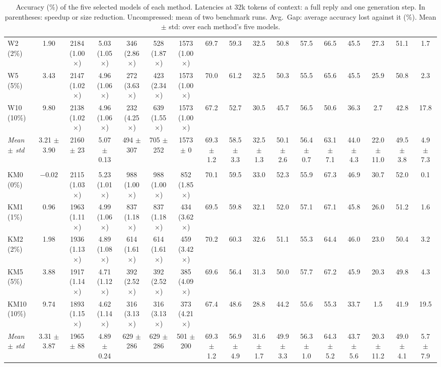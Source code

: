 \documentclass[11pt]{article}
\begin{document}
\begin{landscape}
\begin{table}[!ht]
{\begin{tabular}{lcccccccccccccccc}
W2 (2\%) & 1.90 & 2184 (1.00$\times$) & 5.03 (1.05$\times$) & 346 (2.86$\times$) & 528 (1.87$\times$) & 1573 (1.00$\times$) & 69.7 & 59.3 & 32.5 & 50.8 & 57.5 & 66.5 & 45.5 & 27.3 & 51.1 & 1.7 \\
W5 (5\%) & 3.43 & 2147 (1.02$\times$) & 4.96 (1.06$\times$) & 272 (3.63$\times$) & 423 (2.34$\times$) & 1573 (1.00$\times$) & 70.0 & 61.2 & 32.5 & 50.3 & 55.5 & 65.6 & 45.5 & 25.9 & 50.8 & 2.3 \\
W10 (10\%) & 9.80 & 2138 (1.02$\times$) & 4.96 (1.06$\times$) & 232 (4.25$\times$) & 639 (1.55$\times$) & 1573 (1.00$\times$) & 67.2 & 52.7 & 30.5 & 45.7 & 56.5 & 50.6 & 36.3 & 2.7 & 42.8 & 17.8 \\
\emph{Mean $\pm$ std} & 3.21 $\pm$ 3.90 & 2160 $\pm$ 23 & 5.07 $\pm$ 0.13 & 494 $\pm$ 307 & 705 $\pm$ 252 & 1573 $\pm$ 0 & 69.3 $\pm$ 1.2 & 58.5 $\pm$ 3.3 & 32.5 $\pm$ 1.3 & 50.1 $\pm$ 2.6 & 56.4 $\pm$ 0.7 & 63.1 $\pm$ 7.1 & 44.0 $\pm$ 4.3 & 22.0 $\pm$ 11.0 & 49.5 $\pm$ 3.8 & 4.9 $\pm$ 7.3 \\
\addlinespace
\multicolumn{17}{l}{\emph{Hardware-aware + KV cache: least memory}} \\
KM0 (0\%) & $-0.02$ & 2115 (1.03$\times$) & 5.23 (1.01$\times$) & 988 (1.00$\times$) & 988 (1.00$\times$) & 852 (1.85$\times$) & 70.1 & 59.5 & 33.0 & 52.3 & 55.9 & 67.3 & 46.9 & 30.7 & 52.0 & 0.1 \\
KM1 (1\%) & 0.96 & 1963 (1.11$\times$) & 4.99 (1.06$\times$) & 837 (1.18$\times$) & 837 (1.18$\times$) & 434 (3.62$\times$) & 69.5 & 59.8 & 32.1 & 52.0 & 57.1 & 67.1 & 45.8 & 26.0 & 51.2 & 1.6 \\
KM2 (2\%) & 1.98 & 1936 (1.13$\times$) & 4.89 (1.08$\times$) & 614 (1.61$\times$) & 614 (1.61$\times$) & 459 (3.42$\times$) & 70.2 & 60.3 & 32.6 & 51.1 & 55.3 & 64.4 & 46.0 & 23.0 & 50.4 & 3.2 \\
KM5 (5\%) & 3.88 & 1917 (1.14$\times$) & 4.71 (1.12$\times$) & 392 (2.52$\times$) & 392 (2.52$\times$) & 385 (4.09$\times$) & 69.6 & 56.4 & 31.3 & 50.0 & 57.7 & 67.2 & 45.9 & 20.3 & 49.8 & 4.3 \\
KM10 (10\%) & 9.74 & 1893 (1.15$\times$) & 4.62 (1.14$\times$) & 316 (3.13$\times$) & 316 (3.13$\times$) & 373 (4.21$\times$) & 67.4 & 48.6 & 28.8 & 44.2 & 55.6 & 55.3 & 33.7 & 1.5 & 41.9 & 19.5 \\
\emph{Mean $\pm$ std} & 3.31 $\pm$ 3.87 & 1965 $\pm$ 88 & 4.89 $\pm$ 0.24 & 629 $\pm$ 286 & 629 $\pm$ 286 & 501 $\pm$ 200 & 69.3 $\pm$ 1.2 & 56.9 $\pm$ 4.9 & 31.6 $\pm$ 1.7 & 49.9 $\pm$ 3.3 & 56.3 $\pm$ 1.0 & 64.3 $\pm$ 5.2 & 43.7 $\pm$ 5.6 & 20.3 $\pm$ 11.2 & 49.0 $\pm$ 4.1 & 5.7 $\pm$ 7.9 \\
\bottomrule
\end{tabular}}
\caption{Accuracy (\%) of the five selected models of each method. Latencies at 32k tokens of context: a full reply and one generation step. In parentheses: speedup or size reduction. Uncompressed: mean of two benchmark runs. Avg.\ Gap: average accuracy lost against it (\%). Mean $\pm$ std: over each method's five models.}
\label{tab:compare}
\end{table}
\end{landscape}
\end{document}

